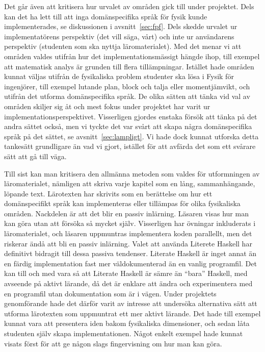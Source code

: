 Det går även att kritisera hur urvalet av områden gick till under projektet.
Dels kan det ha lett till att inga domänspecifika språk för fysik kunde
implementerades, se diskussionen i avsnitt~\ref{sec:fpf}. Dels skedde urvalet ur
implementatörens perspektiv (det vill säga, vårt) och inte ur användarens
perspektiv (studenten som ska nyttja läromaterialet). Med det menar vi att
områden valdes utifrån hur det implementationsmässigt hängde ihop, till exempel
att matematisk analys är grunden till flera tillämpningar. Istället hade områden
kunnat väljas utifrån de fysikaliska problem studenter ska lösa i Fysik för
ingenjörer, till exempel lutande plan, block och talja eller momentjämvikt, och
utifrån det utforma domänspecifika språk. De olika sätten att tänka vid val av
områden skiljer sig åt och mest fokus under projektet har varit ur
implementationsperspektivet. Visserligen gjordes enstaka försök att tänka på det
andra sättet också, men vi tyckte det var svårt att skapa några domänspecifika
språk på det sättet, se avsnitt~\ref{sec:lampligt}. Vi hade dock kunnat utforska
detta tankesätt grundligare än vad vi gjort, istället för att avfärda det som
ett svårare sätt att gå till väga.

Till sist kan man kritisera den allmänna metoden som valdes för utformningen av
läromaterialet, nämligen att skriva varje kapitel som en lång, sammanhängande,
löpande text. Lärotexten har skrivits som en berättelse om hur ett
domänspecifikt språk kan implementeras eller tillämpas för olika fysikaliska
områden. Nackdelen är att det blir en passiv inlärning. Läsaren visas hur man
kan göra utan att försöka så mycket själv. Visserligen har övningar inkluderats
i läromaterialet, och läsaren uppmuntras implementera koden parallellt, men det
riskerar ändå att bli en passiv inlärning. Valet att använda Literete
Haskell har definitivt bidragit till dessa passiva tendenser. Literate Haskell är
inget annat än en färdig implementation fast mer väldokumenterad
än en vanlig programfil. Det kan till och med vara så att Literate
Haskell är sämre än ``bara'' Haskell, med avseende på aktivt lärande, då det är
enklare att ändra och experimentera med en programfil utan dokumentation som är i vägen. Under
projektets genomförande hade det därför varit av intresse att undersöka
alternativa sätt att utforma lärotexten som uppmuntrat ett mer aktivt lärande.
Det hade till exempel kunnat vara att presentera iden bakom fysikaliska
dimensioner, och sedan låta studenten själv skapa implementationen. Något enkelt
exempel hade kunnat visats först för att ge någon slags fingervisning om hur man
kan göra.

